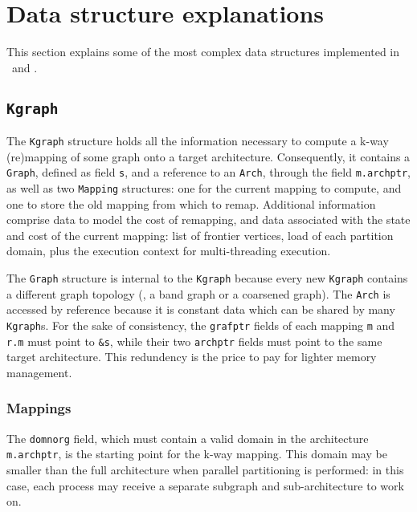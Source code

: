 
\section{Data structure explanations}
\label{sec-data}

This section explains some of the most complex data structures
implemented in \scotch\ and \ptscotch.

\subsection{\texttt{Kgraph}}
\label{sec-data-kgraph}

The \texttt{Kgraph} structure holds all the information necessary to
compute a k-way (re)mapping of some graph onto a target architecture.
Consequently, it contains a \texttt{Graph}, defined as field
\texttt{s}, and a reference to an \texttt{Arch}, through the field
\texttt{m.archptr}, as well as two \texttt{Mapping} structures: one
for the current mapping to compute, and one to store the old mapping
from which to remap. Additional information comprise data to model the
cost of remapping, and data associated with the state and cost of the
current mapping: list of frontier vertices, load of each partition
domain, plus the execution context for multi-threading execution.

The \texttt{Graph} structure is internal to the \texttt{Kgraph}
because every new \texttt{Kgraph} contains a different graph topology
(\eg, a band graph or a coarsened graph). The \texttt{Arch} is
accessed by reference because it is constant data which can be shared
by many \texttt{Kgraph}s. For the sake of consistency, the
\texttt{grafptr} fields of each mapping \texttt{m} and \texttt{r.m}
must point to \texttt{\&s}, while their two \texttt{archptr} fields
must point to the same target architecture. This redundency is the
price to pay for lighter memory management.

\subsubsection{Mappings}

The \texttt{domnorg} field, which must contain a valid domain in the
architecture \texttt{m.archptr}, is the starting point for the k-way
mapping. This domain may be smaller than the full architecture when
parallel partitioning is performed: in this case, each process may
receive a separate subgraph and sub-architecture to work on.

